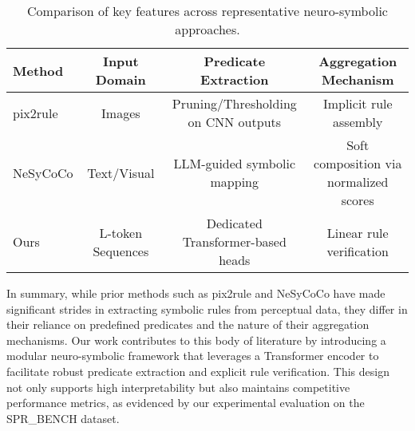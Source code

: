 \documentclass{article}
\begin{document}
\begin{table}[h]
\centering
\begin{tabular}{lccc}
\hline
Method & Input Domain & Predicate Extraction & Aggregation Mechanism \\
\hline
pix2rule & Images & Pruning/Thresholding on CNN outputs & Implicit rule assembly \\
NeSyCoCo & Text/Visual & LLM-guided symbolic mapping & Soft composition via normalized scores \\
Ours & L-token Sequences & Dedicated Transformer-based heads & Linear rule verification \\
\hline
\end{tabular}
\caption{Comparison of key features across representative neuro-symbolic approaches.}
\label{tab:comparison}
\end{table}

In summary, while prior methods such as pix2rule and NeSyCoCo have made significant strides in extracting symbolic rules from perceptual data, they differ in their reliance on predefined predicates and the nature of their aggregation mechanisms. Our work contributes to this body of literature by introducing a modular neuro-symbolic framework that leverages a Transformer encoder to facilitate robust predicate extraction and explicit rule verification. This design not only supports high interpretability but also maintains competitive performance metrics, as evidenced by our experimental evaluation on the SPR\_BENCH dataset.
\end{document}
